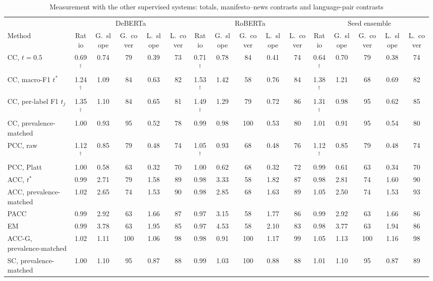 \begin{table}[t]
\caption{Measurement with the other supervised systems: totals, manifesto--news contrasts and language-pair contrasts}
\label{tab:systems}
\centering
\scriptsize
\setlength{\tabcolsep}{2.5pt}
\begin{tabular*}{\textwidth}{@{\extracolsep{\fill}}l ccccc ccccc ccccc@{}}
\toprule
 & \multicolumn{5}{c}{DeBERTa} & \multicolumn{5}{c}{RoBERTa} & \multicolumn{5}{c}{Seed ensemble} \\
\cmidrule(lr){2-6}\cmidrule(lr){7-11}\cmidrule(l){12-16}
Method & Ratio & G.\ slope & G.\ cover & L.\ slope & L.\ cover & Ratio & G.\ slope & G.\ cover & L.\ slope & L.\ cover & Ratio & G.\ slope & G.\ cover & L.\ slope & L.\ cover \\
\midrule
CC, $t = 0.5$ & 0.69$^\dagger$ & 0.74 & 79 & 0.39 & 73 & 0.71$^\dagger$ & 0.78 & 84 & 0.41 & 74 & 0.64$^\dagger$ & 0.70 & 79 & 0.38 & 74 \\
CC, macro-F1 $t^*$ & 1.24$^\dagger$ & 1.09 & 84 & 0.63 & 82 & 1.53$^\dagger$ & 1.42 & 58 & 0.76 & 84 & 1.38$^\dagger$ & 1.21 & 68 & 0.69 & 82 \\
CC, per-label F1 $t_j$ & 1.35$^\dagger$ & 1.10 & 84 & 0.65 & 81 & 1.49$^\dagger$ & 1.29 & 79 & 0.72 & 86 & 1.31$^\dagger$ & 0.98 & 95 & 0.62 & 85 \\
CC, prevalence-matched & 1.00 & 0.93 & 95 & 0.52 & 78 & 0.99 & 0.98 & 100 & 0.53 & 80 & 1.01 & 0.91 & 95 & 0.54 & 80 \\
PCC, raw & 1.12$^\dagger$ & 0.85 & 79 & 0.48 & 74 & 1.05$^\dagger$ & 0.93 & 68 & 0.48 & 76 & 1.12$^\dagger$ & 0.85 & 79 & 0.48 & 74 \\
PCC, Platt & 1.00 & 0.58 & 63 & 0.32 & 70 & 1.00 & 0.62 & 68 & 0.32 & 72 & 0.99 & 0.61 & 63 & 0.34 & 70 \\
ACC, $t^*$ & 0.99 & 2.71 & 79 & 1.58 & 89 & 0.98 & 3.33 & 58 & 1.82 & 87 & 0.98 & 2.81 & 74 & 1.60 & 90 \\
ACC, prevalence-matched & 1.02 & 2.65 & 74 & 1.53 & 90 & 0.98 & 2.85 & 68 & 1.63 & 89 & 1.05 & 2.50 & 74 & 1.53 & 93 \\
PACC & 0.99 & 2.92 & 63 & 1.66 & 87 & 0.97 & 3.15 & 58 & 1.77 & 86 & 0.99 & 2.92 & 63 & 1.66 & 86 \\
EM & 0.99 & 3.78 & 63 & 1.95 & 85 & 0.97 & 4.53 & 58 & 2.10 & 83 & 0.98 & 3.77 & 63 & 1.94 & 86 \\
ACC-G, prevalence-matched & 1.02 & 1.11 & 100 & 1.06 & 98 & 0.98 & 0.91 & 100 & 1.17 & 99 & 1.05 & 1.13 & 100 & 1.16 & 98 \\
SC, prevalence-matched & 1.00 & 1.10 & 95 & 0.87 & 88 & 0.99 & 1.03 & 100 & 0.88 & 88 & 1.01 & 1.10 & 95 & 0.87 & 89 \\

\end{tabular*}
\end{table}
